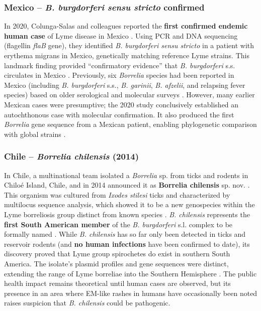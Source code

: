 \documentclass[11pt,letterpaper]{article}
\begin{document}
\subsubsection{Mexico – \textit{B. burgdorferi sensu stricto} confirmed}
In 2020, Colunga-Salas and colleagues reported the \textbf{first confirmed endemic human case} of Lyme disease in Mexico \citep{Colunga-Salas2020b}. Using PCR and DNA sequencing (flagellin \textit{flaB} gene), they identified \textit{B. burgdorferi sensu stricto} in a patient with erythema migrans in Mexico, genetically matching reference Lyme strains. This landmark finding provided “confirmatory evidence” that \textit{B. burgdorferi} s.s. circulates in Mexico \citep{Colunga-Salas2020c}. Previously, six \textit{Borrelia} species had been reported in Mexico (including \textit{B. burgdorferi} s.s., \textit{B. garinii}, \textit{B. afzelii}, and relapsing fever species) based on older serological and molecular surveys \citep{Colunga-Salas2020d}. However, many earlier Mexican cases were presumptive; the 2020 study conclusively established an autochthonous case with molecular confirmation. It also produced the first \textit{Borrelia} gene sequence from a Mexican patient, enabling phylogenetic comparison with global strains \citep{Colunga-Salas2020e}.

\subsubsection{Chile – \textit{Borrelia chilensis} (2014)}
In Chile, a multinational team isolated a \textit{Borrelia} sp. from ticks and rodents in Chiloé Island, Chile, and in 2014 announced it as \textbf{Borrelia chilensis} sp. nov. \citep{Ivanova2014}. This organism was cultured from \textit{Ixodes stilesi} ticks and characterized by multilocus sequence analysis, which showed it to be a new genospecies within the Lyme borreliosis group distinct from known species \citep{Ivanova2014a}. \textit{B. chilensis} represents the \textbf{first South American member} of the \textit{B. burgdorferi} s.l. complex to be formally named \citep{Ivanova2014b}. While \textit{B. chilensis} has so far only been detected in ticks and reservoir rodents (and \textbf{no human infections} have been confirmed to date), its discovery proved that Lyme group spirochetes do exist in southern South America. The isolate’s plasmid profiles and gene sequences were distinct, extending the range of Lyme borreliae into the Southern Hemisphere \citep{Ivanova2014c}. The public health impact remains theoretical until human cases are observed, but its presence in an area where EM-like rashes in humans have occasionally been noted raises suspicion that \textit{B. chilensis} could be pathogenic.
\end{document}
